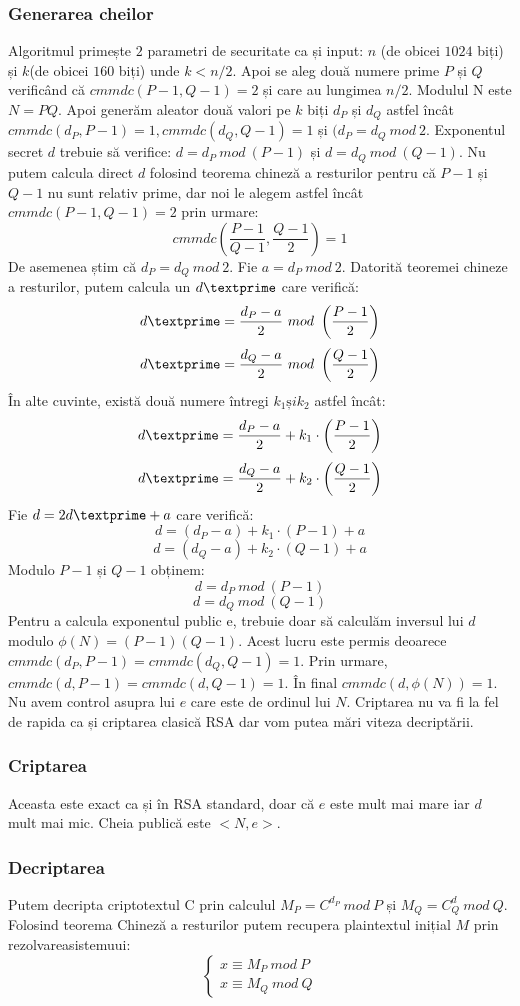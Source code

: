 \documentclass[12pt, oneside]{book}
\begin{document}
	    \subsubsection{Generarea cheilor}
	    Algoritmul primește $2$ parametri de securitate ca și input: $n$ (de obicei $1024$ biți) și $k$(de obicei $160$ biți) unde $k<n/2$. Apoi se aleg două numere prime $P$ și $Q$ verificând că $cmmdc(P-1,Q-1)=2$ și care au lungimea $n/2$. Modulul N este $N=PQ$. Apoi generăm aleator două valori pe $k$ biți $d_P$ și $d_Q$ astfel încât $cmmdc(d_P,P-1)=1, cmmdc(d_Q,Q-1)=1$ și $(d_P=d_Q \ mod \ 2$. Exponentul secret $d$ trebuie să verifice: $d=d_P \ mod \ (P-1)$ și $d=d_Q \ mod \ (Q-1)$. Nu putem calcula direct $d$ folosind teorema chineză a resturilor pentru că $P-1$ și $Q-1$ nu sunt relativ prime, dar noi le alegem astfel încât $cmmdc(P-1,Q-1)=2$ prin urmare:
	    $$cmmdc \left( \frac{P-1}{Q-1},\frac{Q-1}{2}  \right)=1  $$
	     De asemenea știm că $ d_P=d_Q \ mod \ 2$. Fie $ a=d_P \ mod \ 2 $. Datorită teoremei chineze a resturilor, putem calcula un $d\textprime$ care verifică:
	    $$d\textprime = \frac{d_P-a}{2} \ mod \ \left( \frac{P-1}{2} \right) $$
	    $$d\textprime = \frac{d_Q-a}{2} \ mod \ \left( \frac{Q-1}{2} \right) $$
	    În alte cuvinte, există două numere întregi $k_1 și k_2$ astfel încât: 
	    $$d\textprime = \frac{d_P-a}{2} + k_1 \cdot   \left( \frac{P-1}{2} \right) $$
	    $$d\textprime = \frac{d_Q-a}{2} + k_2 \cdot   \left( \frac{Q-1}{2} \right) $$
	    Fie $ d=2d\textprime +a$ care verifică:
	    $$ d=(d_P-a) + k_1 \cdot   (P-1) +a$$
	    $$ d=(d_Q-a) + k_2 \cdot   (Q-1) +a$$
	    Modulo $P-1$ și $Q-1$ obținem:
	    $$d=d_P \ mod \ \left( P-1 \right)$$
	    $$d=d_Q \ mod \ \left( Q-1 \right)$$
	    Pentru a calcula exponentul public e, trebuie doar să calculăm inversul lui $d$ modulo $\phi(N)=(P-1)(Q-1)$. Acest lucru este permis deoarece $cmmdc(d_P,P-1)=cmmdc(d_Q,Q-1)=1$. Prin urmare, $cmmdc(d,P-1)=cmmdc(d,Q-1)=1$. În final $cmmdc(d,\phi(N))=1$. Nu avem control asupra lui $e$ care este de ordinul lui $N$. Criptarea nu va fi la fel de rapida ca și criptarea clasică RSA dar vom putea mări viteza decriptării.
	   \subsubsection{Criptarea}
	    Aceasta este exact ca și în RSA standard, doar că $e$ este mult mai mare iar $d$ mult mai mic. Cheia publică este $<N,e>$.
	    \subsubsection{Decriptarea}
	    Putem decripta criptotextul C prin calculul $M_P = C^{d_P} \ mod \ P$ și $M_Q=C^d_Q  \ mod \ Q$. Folosind teorema Chineză a resturilor putem recupera plaintextul inițial $M$ prin rezolvareasistemuui:
	    \[
\begin{cases}
x \equiv M_P \ mod \ P  \\
x \equiv M_Q \ mod \ Q
\end{cases}
\]
	    
\end{document}
